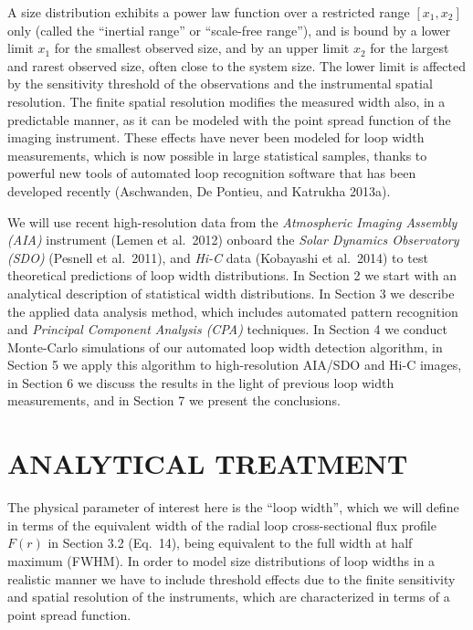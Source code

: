 \documentclass[10pt,preprint]{aastex}  %
\begin{document}
A size distribution exhibits a power law function over a restricted
range $[x_1,x_2]$ only (called the ``inertial range'' or 
``scale-free range''), and is bound 
by a lower limit $x_1$ for the smallest observed size, and by an 
upper limit $x_2$ for the largest and rarest observed size, often
close to the system size. The lower limit is affected by the sensitivity 
threshold of the observations and the instrumental spatial resolution. 
The finite spatial resolution modifies the measured width also, in a
predictable manner, as it can be modeled with the point spread function
of the imaging instrument. These effects have never been modeled 
for loop width measurements, which is now possible in large statistical 
samples, thanks to powerful new tools of automated loop recognition 
software that has been developed recently (Aschwanden, De Pontieu, 
and Katrukha 2013a). 

We will use recent high-resolution data from the {\sl Atmospheric 
Imaging Assembly (AIA)} instrument (Lemen et al.~2012) 
onboard the {\sl Solar Dynamics Observatory (SDO)} (Pesnell et al.~2011),
and {\sl Hi-C} data (Kobayashi et al.~2014) 
to test theoretical predictions of loop width distributions.
In Section 2 we start with an analytical description of statistical 
width distributions.
In Section 3 we describe the applied data analysis method, which
includes automated pattern recognition and {\sl Principal
Component Analysis (CPA)} techniques. 
In Section 4 we conduct Monte-Carlo simulations of our automated
loop width detection algorithm, in Section 5 we apply this algorithm
to high-resolution AIA/SDO and Hi-C images, in Section 6
we discuss the results in the light of previous loop width measurements,
and in Section 7 we present the conclusions.

\section{	ANALYTICAL TREATMENT                     }

The physical parameter of interest here is the ``loop width'', which 
we will define in terms of the equivalent width of the radial loop 
cross-sectional flux profile $F(r)$ in Section 3.2 (Eq.~14), 
being equivalent to the full width at half maximum (FWHM).
In order to model size distributions of loop widths in a realistic
manner we have to include threshold effects due to the finite 
sensitivity and spatial resolution of the instruments, which are
characterized in terms of a point spread function. 
\end{document}
